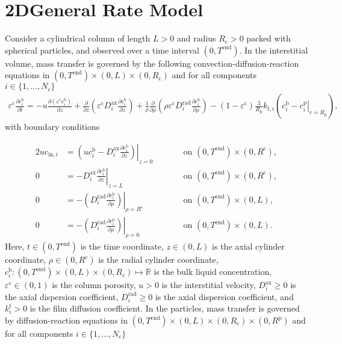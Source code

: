 \documentclass{article}
\begin{document}
\section*{2DGeneral Rate Model}
Consider a cylindrical column of length $L > 0$  and radius $R_{\mathrm{c}} > 0$ packed with spherical particles, and observed over a time interval $(0, T^{\mathrm{end}})$.
In the interstitial volume, mass transfer is governed by the following convection-diffusion-reaction equations in $(0, T^\mathrm{end})\times (0, L)\times (0, R_\mathrm{c})$ and for all components $i\in\{1, \dots, N_c\}$
\begin{align}
\varepsilon^{\mathrm{c}} \frac{\partial c^{\mathrm{b}}_i}{\partial t} = - u \frac{\partial \left( \varepsilon^{\mathrm{c}} c^{\mathrm{b}}_i \right)}{\partial z} + \frac{\partial}{\partial z} \left( \varepsilon^{\mathrm{c}} D^{\mathrm{ax}}_{i} \frac{\partial c^{\mathrm{b}}_i}{\partial z} \right) + \frac{1}{\rho} \frac{\partial}{\partial \rho} \left( \rho \varepsilon^{\mathrm{c}} D^{\mathrm{rad}}_{i}  \frac{\partial c^{\mathrm{b}}_i}{\partial \rho} \right)- \left(1 - \varepsilon^{\mathrm{c}} \right) \frac{3}{R_{\mathrm{p}}} k_{\mathrm{f},i} \left(c^{\mathrm{b}}_i - \left. c^{\mathrm{p}}_{i} \right|_{r = R_{\mathrm{p}}} \right),
\end{align}
with boundary conditions

\begin{alignat}{2}
u c_{\mathrm{in},i} &= \left.\left( u c^{\mathrm{b}}_i - D^{\mathrm{ax}}_{i} \frac{\partial c^{\mathrm{b}}_i}{\partial z}\right)\right|_{z=0} & &\qquad\text{on }(0, T^{\mathrm{end}})\times (0, R^{\mathrm{c}}),\\
               0 &= - D^{\mathrm{ax}}_{i} \left. \frac{\partial c^{\mathrm{b}}_i}{\partial z} \right|_{z=L} & &\qquad\text{on }(0, T^{\mathrm{end}})\times (0, R^{\mathrm{c}}),\\
0 &= - \left(D^{\mathrm{rad}}_{i} \left. \frac{\partial c^{\mathrm{b}}_i}{\partial \rho} \right) \right|_{\rho=R^{\mathrm{c}}} & &\qquad\text{on }(0, T^{\mathrm{end}}) \times (0, L),\\
0 &= - \left(D^{\mathrm{rad}}_{i} \left. \frac{\partial c^{\mathrm{b}}_i}{\partial \rho} \right) \right|_{\rho=0} & &\qquad\text{on }(0, T^{\mathrm{end}}) \times (0, L).
\end{alignat}
Here, $t\in (0, T^{\mathrm{end}})$ is the time coordinate, $z\in (0, L)$ is the axial cylinder coordinate, $\rho\in (0, R^{\mathrm{c}})$ is the radial cylinder coordinate, $c^\mathrm{b}_i\colon (0, T^\mathrm{end})\times (0, L)\times (0, R_\mathrm{c}) \mapsto \mathbb{R}$ is the bulk liquid concentration, $\varepsilon^\mathrm{c}\in (0, 1)$ is the column porosity, $u> 0$ is the interstitial velocity, $D^\mathrm{ax}_i\geq 0$ is the axial dispersion coefficient, $D^\mathrm{rad}_i\geq 0$ is the axial dispersion coefficient, and $k^\mathrm{f}_i> 0$ is the film diffusion coefficient.
In the particles, mass transfer is governed by diffusion-reaction equations in $ (0, T^\mathrm{end}) \times (0, L)\times (0, R_\mathrm{c})\times (0, R^{\mathrm{p}})$ and for all components $i\in\{1, \dots, N_c\}$
\end{document}
